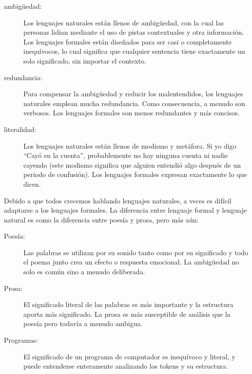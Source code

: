 \documentclass[10pt]{book}
\begin{document}
\begin{description}

\item[ambigüedad:] Los lenguajes naturales están llenos de ambigüedad, con la cual
las personas lidian mediante el uso de pistas contextuales y otra información.
Los lenguajes formales están diseñados para ser casi o completamente inequívocos,
lo cual significa que cualquier sentencia tiene exactamente un solo significado,
sin importar el contexto.

\item[redundancia:] Para compensar la ambigüedad y reducir
los malentendidos, los lenguajes naturales emplean mucha
redundancia.  Como consecuencia, a menudo son verbosos.  Los lenguajes formales
son menos redundantes y más concisos.

\item[literalidad:] Los lenguajes naturales están llenos de modismo y metáfora.
Si yo digo ``Cayó en la cuenta'', probablemente no hay ninguna cuenta ni
nadie cayendo (este modismo significa que alguien entendió algo
después de un periodo de confusión).  Los lenguajes formales
expresan exactamente lo que dicen.

\end{description}

Debido a que todos crecemos hablando lenguajes naturales, a veces es
difícil adaptarse a los lenguajes formales.  La diferencia entre lenguaje formal
y lenguaje natural es como la diferencia entre poesía y prosa, pero
más aún:  

\begin{description}

\item[Poesía:] Las palabras se utilizan por su sonido tanto como por
su significado y todo el poema junto crea un efecto o
respuesta emocional.  La ambigüedad no solo es común sino a menudo
deliberada.

\item[Prosa:] El significado literal de las palabras es más importante
y la estructura aporta más significado.  La prosa es más susceptible de
análisis que la poesía pero todavía a menudo ambigua.

\item[Programas:] El significado de un programa de computador es inequívoco
y literal, y puede entenderse enteramente analizando los
tokens y su estructura.

\end{description}
\end{document}
